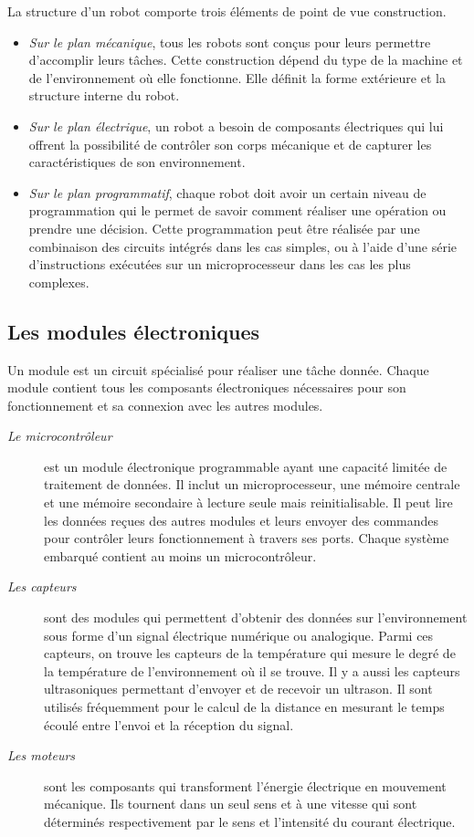 La structure d'un robot comporte trois éléments de point de vue construction.

\begin{itemize}
  \item \emph{Sur le plan mécanique}, tous les robots sont conçus pour leurs
  permettre d'accomplir leurs
  tâches. Cette construction dépend du type de la machine et de l'environnement
  où elle fonctionne. Elle définit la forme extérieure et la structure interne
  du robot.
  \item \emph{Sur le plan électrique}, un robot a besoin de composants
  électriques qui lui offrent la possibilité de
  contrôler son corps mécanique et de capturer les caractéristiques de son
  environnement.
  \item \emph{Sur le plan programmatif}, chaque robot doit avoir un certain
  niveau de programmation qui le permet de
  savoir comment réaliser une opération ou prendre une décision. Cette
  programmation peut être réalisée par une combinaison des circuits intégrés dans
  les cas simples, ou à l'aide d'une série d'instructions exécutées sur un
  microprocesseur dans les cas les plus complexes.
\end{itemize}

\subsection{Les modules électroniques}
Un module est un circuit spécialisé pour réaliser une tâche donnée. Chaque
module contient tous les composants électroniques nécessaires pour son
fonctionnement et sa connexion avec les autres modules.

\begin{description}
  \item[\emph{Le microcontrôleur}] est un module électronique programmable ayant une capacité
  limitée de traitement de données. Il inclut un microprocesseur, une mémoire
  centrale et une mémoire secondaire à lecture seule mais reinitialisable.
  Il peut lire les données reçues des autres modules et leurs envoyer des commandes
  pour contrôler leurs fonctionnement à travers ses ports. Chaque système embarqué
  contient au moins un microcontrôleur.
  \item[\emph{Les capteurs}] sont des modules qui permettent d'obtenir des données sur
  l'environnement sous forme d'un signal électrique numérique ou analogique.
  Parmi ces capteurs, on trouve les capteurs de la température qui mesure le degré
  de la température de l'environnement où il se trouve. Il y a aussi les capteurs
  ultrasoniques permettant d'envoyer et de recevoir un ultrason. Il sont utilisés
  fréquemment pour le calcul de la distance en mesurant le temps écoulé entre
  l'envoi et la réception du signal.
  \item[\emph{Les moteurs}] sont les composants qui transforment l'énergie électrique en
  mouvement mécanique. Ils tournent dans un seul sens et à une vitesse qui
  sont déterminés respectivement par le sens et l'intensité du courant électrique.
\end{description}

